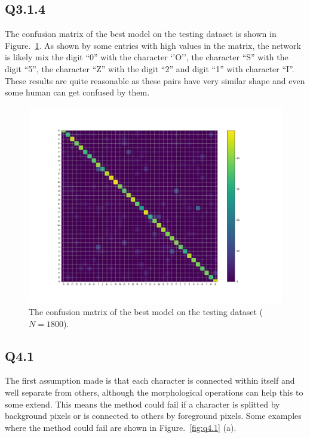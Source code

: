 \documentclass[11pt]{article}
\begin{document}
\newpage

\subsection*{Q3.1.4}

The confusion matrix of the best model on the testing dataset is shown in Figure.~\ref{fig:q3.1.4}. As shown by some entries with high values in the matrix, the network is likely mix the digit ``0'' with the character `'O'', the character ``S'' with the digit ``5'', the character ``Z'' with the digit ``2'' and digit ``1'' with character ``I''. These results are quite reasonable as these pairs have very similar shape and even some human can get confused by them.

\begin{figure}[h!]
    \centering
    \includegraphics[width=.8\linewidth]{../results/q3_1_4.png}
    \caption{The confusion matrix of the best model on the testing dataset ($N=1800$). }
    \label{fig:q3.1.4}
\end{figure}

\newpage

\subsection*{Q4.1}

The first assumption made is that each character is connected within itself and well separate from others, although the morphological operations can help this to some extend. This means the method could fail if a character is splitted by background pixels or is connected to others by foreground pixels. Some examples where the method could fail are shown in Figure.~\ref{fig:q4.1} (a).
\end{document}
